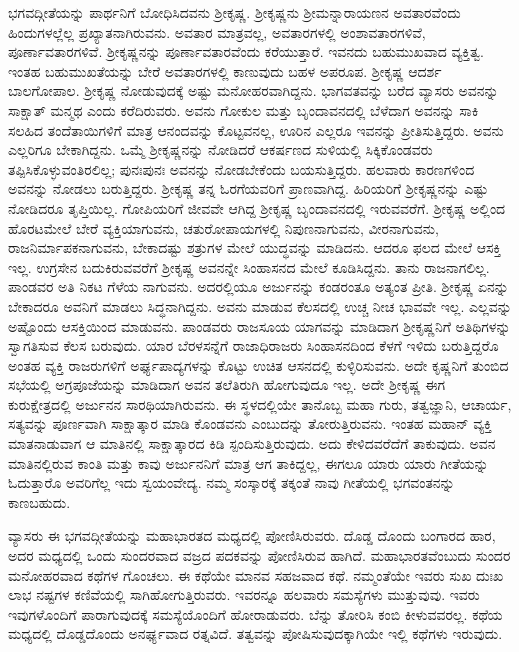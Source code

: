 ಭಗವದ್ಗೀತೆಯನ್ನು ಪಾರ್ಥನಿಗೆ ಬೋಧಿಸಿದವನು ಶ್ರೀಕೃಷ್ಣ. ಶ್ರೀಕೃಷ್ಣನು ಶ್ರೀಮನ್ನಾರಾಯಣನ ಅವತಾರವೆಂದು ಹಿಂದುಗಳಲ್ಲೆಲ್ಲ ಪ್ರಖ್ಯಾತನಾಗಿರುವನು. ಅವತಾರ ಮಾತ್ರವಲ್ಲ, ಅವತಾರಗಳಲ್ಲಿ ಅಂಶಾವತಾರಗಳಿವೆ, ಪೂರ್ಣಾವತಾರಗಳಿವೆ. ಶ್ರೀಕೃಷ್ಣನನ್ನು ಪೂರ್ಣಾವತಾರವೆಂದು ಕರೆಯುತ್ತಾರೆ. ಇವನದು ಬಹುಮುಖವಾದ ವ್ಯಕ್ತಿತ್ವ. ಇಂತಹ ಬಹುಮುಖತೆಯನ್ನು ಬೇರೆ ಅವತಾರಗಳಲ್ಲಿ ಕಾಣುವುದು ಬಹಳ ಅಪರೂಪ. ಶ್ರೀಕೃಷ್ಣ ಆದರ್ಶ ಬಾಲಗೋಪಾಲ. ಶ್ರೀಕೃಷ್ಣ ನೋಡುವುದಕ್ಕೆ ಅಷ್ಟು ಮನೋಹರವಾಗಿದ್ದನು. ಭಾಗವತವನ್ನು ಬರೆದ ವ್ಯಾಸರು ಅವನನ್ನು ಸಾಕ್ಷಾತ್ ಮನ್ಮಥ ಎಂದು ಕರೆದಿರುವರು. ಅವನು ಗೋಕುಲ ಮತ್ತು ಬೃಂದಾವನದಲ್ಲಿ ಬೆಳೆದಾಗ ಅವನನ್ನು ಸಾಕಿ ಸಲಹಿದ ತಂದೆತಾಯಿಗಳಿಗೆ ಮಾತ್ರ ಆನಂದವನ್ನು ಕೊಟ್ಟವನಲ್ಲ, ಊರಿನ ಎಲ್ಲರೂ ಇವನನ್ನು ಪ್ರೀತಿಸುತ್ತಿದ್ದರು. ಅವನು ಎಲ್ಲರಿಗೂ ಬೇಕಾಗಿದ್ದನು. ಒಮ್ಮೆ ಶ್ರೀಕೃಷ್ಣನನ್ನು ನೋಡಿದರೆ ಆಕರ್ಷಣದ ಸುಳಿಯಲ್ಲಿ ಸಿಕ್ಕಿಕೊಂಡವರು ತಪ್ಪಿಸಿಕೊಳ್ಳುವಂತಿರಲಿಲ್ಲ; ಪುನಃಪುನಃ ಅವನನ್ನು ನೋಡಬೇಕೆಂದು ಬಯಸುತ್ತಿದ್ದರು. ಹಲವಾರು ಕಾರಣಗಳಿಂದ ಅವನನ್ನು ನೋಡಲು ಬರುತ್ತಿದ್ದರು. ಶ್ರೀಕೃಷ್ಣ ತನ್ನ ಓರಗೆಯವರಿಗೆ ಪ್ರಾಣವಾಗಿದ್ದ. ಹಿರಿಯರಿಗೆ ಶ್ರೀಕೃಷ್ಣನನ್ನು ಎಷ್ಟು ನೋಡಿದರೂ ತೃಪ್ತಿಯಿಲ್ಲ. ಗೋಪಿಯರಿಗೆ ಜೀವವೇ ಆಗಿದ್ದ ಶ್ರೀಕೃಷ್ಣ ಬೃಂದಾವನದಲ್ಲಿ ಇರುವವರೆಗೆ. ಶ್ರೀಕೃಷ್ಣ ಅಲ್ಲಿಂದ ಹೊರಟಮೇಲೆ ಬೇರೆ ವ್ಯಕ್ತಿಯಾಗುವನು, ಚತುರೋಪಾಯಗಳಲ್ಲಿ ನಿಪುಣನಾಗುವನು, ವೀರನಾಗುವನು, ರಾಜನಿರ್ಮಾಪಕನಾಗುವನು, ಬೇಕಾದಷ್ಟು ಶತ್ರುಗಳ ಮೇಲೆ ಯುದ್ಧವನ್ನು ಮಾಡಿದನು. ಆದರೂ ಫಲದ ಮೇಲೆ ಆಸಕ್ತಿ ಇಲ್ಲ. ಉಗ್ರಸೇನ ಬದುಕಿರುವವರೆಗೆ ಶ್ರೀಕೃಷ್ಣ ಅವನನ್ನೇ ಸಿಂಹಾಸನದ ಮೇಲೆ ಕೂಡಿಸಿದ್ದನು. ತಾನು ರಾಜನಾಗಲಿಲ್ಲ. ಪಾಂಡವರ ಅತಿ ನಿಕಟ ಗೆಳೆಯ ನಾಗುವನು. ಅದರಲ್ಲಿಯೂ ಅರ್ಜುನನ್ನು ಕಂಡರಂತೂ ಅತ್ಯಂತ ಪ್ರೀತಿ. ಶ್ರೀಕೃಷ್ಣ ಏನನ್ನು ಬೇಕಾದರೂ ಅವನಿಗೆ ಮಾಡಲು ಸಿದ್ಧನಾಗಿದ್ದನು. ಅವನು ಮಾಡುವ ಕೆಲಸದಲ್ಲಿ ಉಚ್ಚ ನೀಚ ಭಾವವೇ ಇಲ್ಲ. ಎಲ್ಲವನ್ನು ಅಷ್ಟೊಂದು ಆಸಕ್ತಿಯಿಂದ ಮಾಡುವನು. ಪಾಂಡವರು ರಾಜಸೂಯ ಯಾಗವನ್ನು ಮಾಡಿದಾಗ ಶ್ರೀಕೃಷ್ಣನಿಗೆ ಅತಿಥಿಗಳನ್ನು ಸ್ವಾಗತಿಸುವ ಕೆಲಸ ಬರುವುದು. ಯಾರ ಬೆರಳಸನ್ನೆಗೆ ರಾಜಾಧಿರಾಜರು ಸಿಂಹಾಸನದಿಂದ ಕೆಳಗೆ ಇಳಿದು ಬರುತ್ತಿದ್ದರೊ ಅಂತಹ ವ್ಯಕ್ತಿ ರಾಜರುಗಳಿಗೆ ಅರ್ಘ್ಯಪಾದ್ಯಗಳನ್ನು ಕೊಟ್ಟು ಉಚಿತ ಆಸನದಲ್ಲಿ ಕುಳ್ಳಿರಿಸುವನು. ಅದೇ ಕೃಷ್ಣನಿಗೆ ತುಂಬಿದ ಸಭೆಯಲ್ಲಿ ಅಗ್ರಪೂಜೆಯನ್ನು ಮಾಡಿದಾಗ ಅವನ ತಲೆತಿರುಗಿ ಹೋಗುವುದೂ ಇಲ್ಲ. ಅದೇ ಶ್ರೀಕೃಷ್ಣ ಈಗ ಕುರುಕ್ಷೇತ್ರದಲ್ಲಿ ಅರ್ಜುನನ ಸಾರಥಿಯಾಗಿರುವನು. ಈ ಸ್ಥಳದಲ್ಲಿಯೇ ತಾನೊಬ್ಬ ಮಹಾ ಗುರು, ತತ್ವಜ್ಞಾನಿ, ಆಚಾರ್ಯ, ಸತ್ಯವನ್ನು ಪೂರ್ಣವಾಗಿ ಸಾಕ್ಷಾತ್ಕಾರ ಮಾಡಿ ಕೊಂಡವನು ಎಂಬುದನ್ನು ತೋರುತ್ತಿರುವನು. ಇಂತಹ ಮಹಾನ್ ವ್ಯಕ್ತಿ ಮಾತನಾಡುವಾಗ ಆ ಮಾತಿನಲ್ಲಿ ಸಾಕ್ಷಾತ್ಕಾರದ ಕಿಡಿ ಸ್ಪಂದಿಸುತ್ತಿರುವುದು. ಅದು ಕೇಳಿದವರೆದೆಗೆ ತಾಕುವುದು. ಅವನ ಮಾತಿನಲ್ಲಿರುವ ಕಾಂತಿ ಮತ್ತು ಕಾವು ಅರ್ಜುನನಿಗೆ ಮಾತ್ರ ಆಗ ತಾಕಿದ್ದಲ್ಲ, ಈಗಲೂ ಯಾರು ಯಾರು ಗೀತೆಯನ್ನು ಓದುತ್ತಾರೊ ಅವರಿಗೆಲ್ಲ ಇದು ಸ್ವಯಂವೇದ್ಯ. ನಮ್ಮ ಸಂಸ್ಕಾರಕ್ಕೆ ತಕ್ಕಂತೆ ನಾವು ಗೀತೆಯಲ್ಲಿ ಭಗವಂತನನ್ನು ಕಾಣಬಹುದು.

ವ್ಯಾಸರು ಈ ಭಗವದ್ಗೀತೆಯನ್ನು ಮಹಾಭಾರತದ ಮಧ್ಯದಲ್ಲಿ ಪೋಣಿಸಿರುವರು. ದೊಡ್ಡ ದೊಂದು ಬಂಗಾರದ ಹಾರ, ಅದರ ಮಧ್ಯದಲ್ಲಿ ಒಂದು ಸುಂದರವಾದ ವಜ್ರದ ಪದಕವನ್ನು ಪೋಣಿಸಿರುವ ಹಾಗಿದೆ. ಮಹಾಭಾರತವೆಂಬುದು ಸುಂದರ ಮನೋಹರವಾದ ಕಥೆಗಳ ಗೊಂಚಲು. ಈ ಕಥೆಯೇ ಮಾನವ ಸಹಜವಾದ ಕಥೆ. ನಮ್ಮಂತೆಯೇ ಇವರು ಸುಖ ದುಃಖ ಲಾಭ ನಷ್ಟಗಳ ಕಣಿವೆಯಲ್ಲಿ ಸಾಗಿಹೋಗುತ್ತಿರುವರು. ಇವರನ್ನೂ ಹಲವಾರು ಸಮಸ್ಯೆಗಳು ಮುತ್ತುವುವು. ಇವರು ಇವುಗಳೊಂದಿಗೆ ಪಾರಾಗುವುದಕ್ಕೆ ಸಮಸ್ಯೆಯೊಂದಿಗೆ ಹೋರಾಡುವರು. ಬೆನ್ನು ತೋರಿಸಿ ಕಂಬಿ ಕೀಳುವವರಲ್ಲ. ಕಥೆಯ ಮಧ್ಯದಲ್ಲಿ ದೊಡ್ಡದೊಂದು ಅನರ್ಘ್ಯವಾದ ರತ್ನವಿದೆ. ತತ್ವವನ್ನು ಪೋಷಿಸುವುದಕ್ಕಾಗಿಯೇ ಇಲ್ಲಿ ಕಥೆಗಳು ಇರುವುದು.

